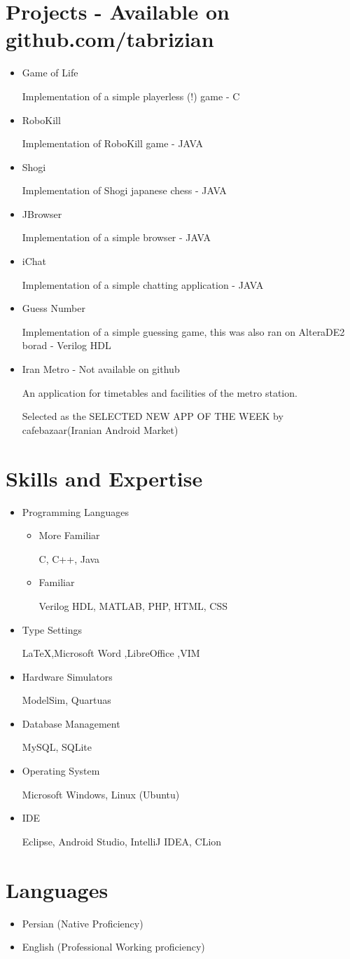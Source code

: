 \documentclass[11pt,a4paper,sans]{moderncv}
\begin{document}
\section{ Projects - Available on github.com/tabrizian}
\begin{itemize}
    \item Game of Life

        Implementation of a simple playerless (!) game - C
    \item RoboKill

        Implementation of RoboKill game - JAVA
    \item Shogi

        Implementation of Shogi japanese chess - JAVA
    \item JBrowser

        Implementation of a simple browser - JAVA
    \item iChat

        Implementation of a simple chatting application - JAVA
    \item Guess Number

        Implementation of a simple guessing game, this was also ran on AlteraDE2 borad - Verilog HDL
    \item Iran Metro - Not available on github

        An application for timetables and facilities of the metro station.

        Selected as the SELECTED NEW APP OF THE WEEK by cafebazaar(Iranian Android Market)
\end{itemize}
\section{Skills and Expertise}
\begin{itemize}
    \item Programming Languages
        \begin{itemize}
            \item More Familiar

                C, C++, Java
            \item Familiar

                Verilog HDL, MATLAB, PHP, HTML, CSS
        \end{itemize}
    \item Type Settings

        \LaTeX ,Microsoft Word ,LibreOffice ,VIM
    \item Hardware Simulators

        ModelSim, Quartuas
    \item Database Management

        MySQL, SQLite
    \item Operating System

        Microsoft Windows, Linux (Ubuntu)
    \item IDE

        Eclipse, Android Studio, IntelliJ IDEA, CLion
\end{itemize}

\section{ Languages}
\begin{itemize}
    \item Persian (Native Proficiency)
    \item English (Professional Working proficiency)
\end{itemize}
\end{document}

